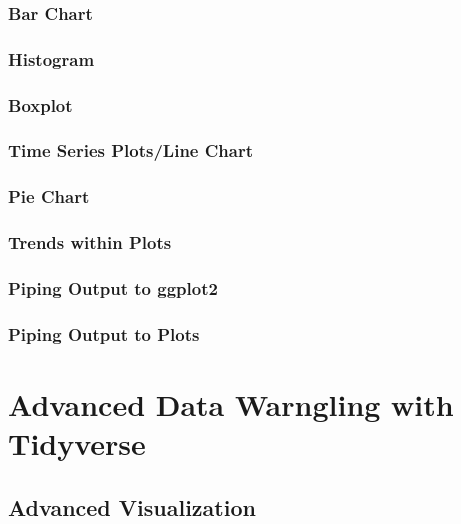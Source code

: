 \documentclass[
]{book}
\begin{document}
\hypertarget{bar-chart}{%
\subsection{Bar Chart}\label{bar-chart}}

\hypertarget{histogram}{%
\subsection{Histogram}\label{histogram}}

\hypertarget{boxplot}{%
\subsection{Boxplot}\label{boxplot}}

\hypertarget{time-series-plotsline-chart}{%
\subsection{Time Series Plots/Line Chart}\label{time-series-plotsline-chart}}

\hypertarget{pie-chart}{%
\subsection{Pie Chart}\label{pie-chart}}

\hypertarget{trends-within-plots}{%
\subsection{Trends within Plots}\label{trends-within-plots}}

\hypertarget{piping-output-to-ggplot2}{%
\subsection{Piping Output to ggplot2}\label{piping-output-to-ggplot2}}

\hypertarget{piping-output-to-plots}{%
\subsection{Piping Output to Plots}\label{piping-output-to-plots}}

\hypertarget{tidy-2}{%
\chapter{Advanced Data Warngling with Tidyverse}\label{tidy-2}}

\hypertarget{advanced-visualization}{%
\section{Advanced Visualization}\label{advanced-visualization}}
\end{document}
